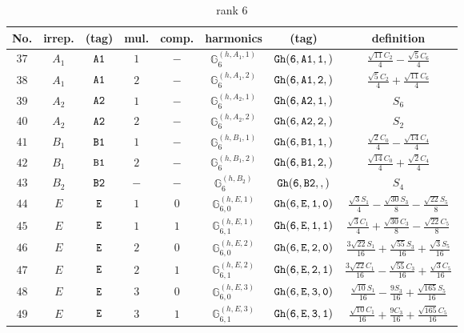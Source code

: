 \documentclass[fleqn,8pt]{jsarticle}
\begin{document}
\begin{table}[ht!]
\begin{center}
\caption{rank 6}
\renewcommand{\arraystretch}{1.3}
\begin{tabular}{cccccccc} \hline \hline
No. & irrep. & (tag) & mul. & comp. & harmonics & (tag) & definition \\ \hline
$ 37 $ & $ A_{1} $ & $ {\tt A1} $ & $ 1 $ & $ - $ & $ \mathbb{G}_{6}^{(h,A_{1},1)} $ & $ {\tt Gh(6,A1,1,)} $ & $ \frac{\sqrt{11} C_{2}}{4} - \frac{\sqrt{5} C_{6}}{4} $ \\
$ 38 $ & $ A_{1} $ & $ {\tt A1} $ & $ 2 $ & $ - $ & $ \mathbb{G}_{6}^{(h,A_{1},2)} $ & $ {\tt Gh(6,A1,2,)} $ & $ \frac{\sqrt{5} C_{2}}{4} + \frac{\sqrt{11} C_{6}}{4} $ \\
$ 39 $ & $ A_{2} $ & $ {\tt A2} $ & $ 1 $ & $ - $ & $ \mathbb{G}_{6}^{(h,A_{2},1)} $ & $ {\tt Gh(6,A2,1,)} $ & $ S_{6} $ \\
$ 40 $ & $ A_{2} $ & $ {\tt A2} $ & $ 2 $ & $ - $ & $ \mathbb{G}_{6}^{(h,A_{2},2)} $ & $ {\tt Gh(6,A2,2,)} $ & $ S_{2} $ \\
$ 41 $ & $ B_{1} $ & $ {\tt B1} $ & $ 1 $ & $ - $ & $ \mathbb{G}_{6}^{(h,B_{1},1)} $ & $ {\tt Gh(6,B1,1,)} $ & $ \frac{\sqrt{2} C_{0}}{4} - \frac{\sqrt{14} C_{4}}{4} $ \\
$ 42 $ & $ B_{1} $ & $ {\tt B1} $ & $ 2 $ & $ - $ & $ \mathbb{G}_{6}^{(h,B_{1},2)} $ & $ {\tt Gh(6,B1,2,)} $ & $ \frac{\sqrt{14} C_{0}}{4} + \frac{\sqrt{2} C_{4}}{4} $ \\
$ 43 $ & $ B_{2} $ & $ {\tt B2} $ & $ - $ & $ - $ & $ \mathbb{G}_{6}^{(h,B_{2})} $ & $ {\tt Gh(6,B2,,)} $ & $ S_{4} $ \\
$ 44 $ & $ E $ & $ {\tt E} $ & $ 1 $ & $ 0 $ & $ \mathbb{G}_{6,0}^{(h,E,1)} $ & $ {\tt Gh(6,E,1,0)} $ & $ \frac{\sqrt{3} S_{1}}{4} - \frac{\sqrt{30} S_{3}}{8} - \frac{\sqrt{22} S_{5}}{8} $ \\
$ 45 $ & $ E $ & $ {\tt E} $ & $ 1 $ & $ 1 $ & $ \mathbb{G}_{6,1}^{(h,E,1)} $ & $ {\tt Gh(6,E,1,1)} $ & $ \frac{\sqrt{3} C_{1}}{4} + \frac{\sqrt{30} C_{3}}{8} - \frac{\sqrt{22} C_{5}}{8} $ \\
$ 46 $ & $ E $ & $ {\tt E} $ & $ 2 $ & $ 0 $ & $ \mathbb{G}_{6,0}^{(h,E,2)} $ & $ {\tt Gh(6,E,2,0)} $ & $ \frac{3 \sqrt{22} S_{1}}{16} + \frac{\sqrt{55} S_{3}}{16} + \frac{\sqrt{3} S_{5}}{16} $ \\
$ 47 $ & $ E $ & $ {\tt E} $ & $ 2 $ & $ 1 $ & $ \mathbb{G}_{6,1}^{(h,E,2)} $ & $ {\tt Gh(6,E,2,1)} $ & $ \frac{3 \sqrt{22} C_{1}}{16} - \frac{\sqrt{55} C_{3}}{16} + \frac{\sqrt{3} C_{5}}{16} $ \\
$ 48 $ & $ E $ & $ {\tt E} $ & $ 3 $ & $ 0 $ & $ \mathbb{G}_{6,0}^{(h,E,3)} $ & $ {\tt Gh(6,E,3,0)} $ & $ \frac{\sqrt{10} S_{1}}{16} - \frac{9 S_{3}}{16} + \frac{\sqrt{165} S_{5}}{16} $ \\
$ 49 $ & $ E $ & $ {\tt E} $ & $ 3 $ & $ 1 $ & $ \mathbb{G}_{6,1}^{(h,E,3)} $ & $ {\tt Gh(6,E,3,1)} $ & $ \frac{\sqrt{10} C_{1}}{16} + \frac{9 C_{3}}{16} + \frac{\sqrt{165} C_{5}}{16} $ \\
 \hline \hline
\end{tabular}
\end{center}
\end{table}
\end{document}
